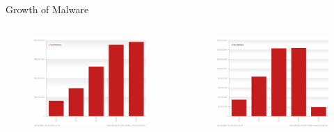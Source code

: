 \documentclass{beamer}
\begin{document}
\begin{frame}[plain,t]{Growth of Malware}
  \begin{columns}
    \begin{column}{5cm}
      \begin{figure}[t]
        \begin{center}
          \includegraphics[scale=0.18]{figures/malware_all.png}
        \end{center}
      \end{figure}
    \end{column}
    \begin{column}{5cm}
      \begin{figure}[t]
        \begin{center}
          \includegraphics[scale=0.18]{figures/malware_new.png}

\end{center}
\end{figure}
\end{column}
\end{columns}
\end{frame}
\end{document}
